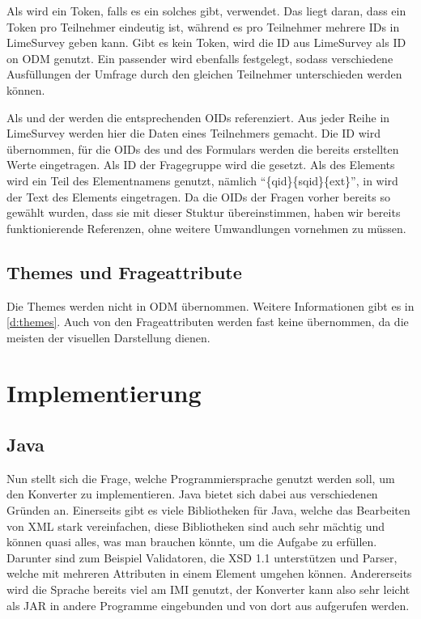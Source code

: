 Als  wird ein Token, falls es ein solches gibt, verwendet. Das liegt daran, dass ein Token pro Teilnehmer eindeutig ist, während es pro Teilnehmer mehrere IDs in LimeSurvey geben kann.
Gibt es kein Token, wird die ID aus LimeSurvey als ID on ODM genutzt.
Ein passender  wird ebenfalls festgelegt, sodass verschiedene Ausfüllungen der Umfrage durch den gleichen Teilnehmer unterschieden werden können.

Als  und  der  werden die entsprechenden OIDs referenziert.
Aus jeder Reihe in LimeSurvey werden hier die Daten eines Teilnehmers gemacht.
Die ID wird übernommen, für die OIDs des  und des Formulars werden die bereits erstellten Werte eingetragen.
Als ID der Fragegruppe wird die  gesetzt.
Als  des  Elements wird ein Teil des Elementnamens genutzt, nämlich \enquote{\{qid\}\{sqid\}\{ext\}}, in  wird der Text des Elements eingetragen.
Da die OIDs der Fragen vorher bereits so gewählt wurden, dass sie mit dieser Stuktur übereinstimmen, haben wir bereits funktionierende Referenzen, ohne weitere Umwandlungen vornehmen zu müssen.

\subsection{Themes und Frageattribute}

Die Themes werden nicht in ODM übernommen. Weitere Informationen gibt es in \cref{d:themes}.
Auch von den Frageattributen werden fast keine übernommen, da die meisten der visuellen Darstellung dienen.

\section{Implementierung}

\subsection{Java}

Nun stellt sich die Frage, welche Programmiersprache genutzt werden soll, um den Konverter zu implementieren.
Java bietet sich dabei aus verschiedenen Gründen an.
Einerseits gibt es viele Bibliotheken für Java, welche das Bearbeiten von XML stark vereinfachen, diese Bibliotheken sind auch sehr mächtig und können quasi alles, was man brauchen könnte, um die Aufgabe zu erfüllen.
Darunter sind zum Beispiel Validatoren, die XSD 1.1 unterstützen und Parser, welche mit mehreren Attributen in einem Element umgehen können.
Andererseits wird die Sprache bereits viel am IMI genutzt, der Konverter kann also sehr leicht als JAR in andere Programme eingebunden und von dort aus aufgerufen werden.

